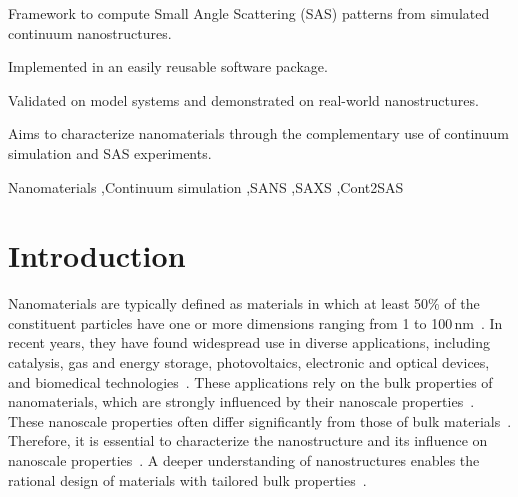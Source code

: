 \documentclass[preprint, 5p, times, twocolumn]{elsarticle}
\begin{document}
\begin{frontmatter}
\begin{highlights}
\item Framework to compute Small Angle Scattering (SAS) patterns from simulated continuum nanostructures.
\item Implemented in an easily reusable software package.
\item Validated on model systems and demonstrated on real-world nanostructures.
\item Aims to characterize nanomaterials through the complementary use of continuum simulation and SAS experiments.
\end{highlights}

\begin{keyword}
Nanomaterials \sep Continuum simulation \sep SANS \sep SAXS \sep Cont2SAS
\end{keyword}

\end{frontmatter}


\section{Introduction}
\label{sec:intro}

Nanomaterials are typically defined as materials in which at least 50\% of the constituent particles have one or more dimensions ranging from 1 to 100\,nm~\cite{modena2019nanoparticle}. In recent years, they have found widespread use in diverse applications, including catalysis, gas and energy storage, photovoltaics, electronic and optical devices, and biomedical technologies~\cite{kolahalam2019review}. These applications rely on the bulk properties of nanomaterials, which are strongly influenced by their nanoscale properties~\cite{baig2021nanomaterials}. These nanoscale properties often differ significantly from those of bulk materials~\cite{talapin2016introduction}. Therefore, it is essential to characterize the nanostructure and its influence on nanoscale properties~\cite{rao2009characterization}. A deeper understanding of nanostructures enables the rational design of materials with tailored bulk properties~\cite{baig2021nanomaterials}.
\end{document}
